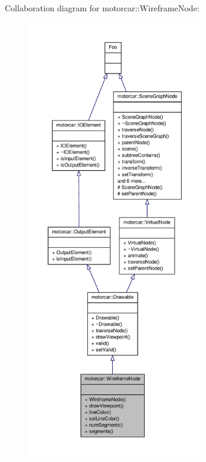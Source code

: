 Collaboration diagram for motorcar\-:\-:Wireframe\-Node\-:
\nopagebreak
\begin{figure}[H]
\begin{center}
\leavevmode
\includegraphics[height=550pt]{classmotorcar_1_1WireframeNode__coll__graph}
\end{center}
\end{figure}
